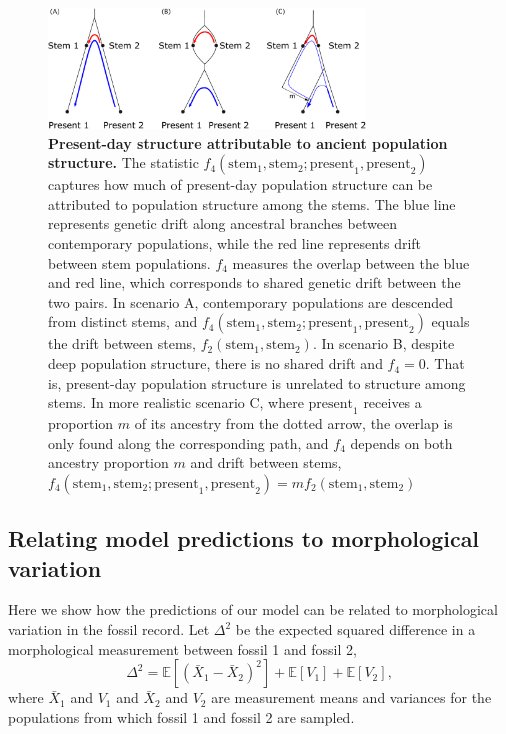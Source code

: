 \documentclass[]{article}
\newcommand{\E}{\mathbb{E}}
\begin{document}
\begin{figure}[ht]
    \centering
    \includegraphics[width=0.75\textwidth]{figures/supp-f4-scenarios}
    \caption{
        \textbf{Present-day structure attributable to ancient population structure.}
        The statistic 
        $f_4(\text{stem}_1, \text{stem}_2; \text{present}_1, \text{present}_2)$
        captures how much of present-day population structure can be attributed to 
        population structure among the stems. The blue line represents genetic drift 
        along ancestral branches between contemporary populations, while the red line 
        represents drift between stem populations. $f_4$ measures the overlap 
        between the blue and red line, which corresponds to shared genetic drift 
        between the two pairs. 
        In scenario A, contemporary populations are descended from distinct stems, and 
        $f_4(\text{stem}_1, \text{stem}_2; \text{present}_1, \text{present}_2)$
        equals the drift between stems, $f_2(\text{stem}_1, \text{stem}_2)$.
        In scenario B, despite deep population structure, there is no shared drift
        and $f_4=0$. That is, present-day population structure is unrelated to
        structure among stems. In more realistic scenario C, where $\text{present}_1$
        receives a proportion $m$ of its ancestry from the dotted arrow, the overlap
        is only found along the corresponding path, and $f_4$ depends on both
        ancestry proportion $m$ and drift between stems,
        $f_4(\text{stem}_1, \text{stem}_2; \text{present}_1, \text{present}_2)
        = mf_2(\text{stem}_1, \text{stem}_2)$
    }
    \label{fig:supp-f4-scenarios}
\end{figure}

\subsection{Relating model predictions to morphological variation}
\label{sec:morpho_diff}

Here we show how the predictions of our model can be related to morphological
variation in the fossil record.
Let $\Delta^2$ be the expected squared difference in a morphological measurement
between fossil 1 and fossil 2,
\begin{equation}
    \Delta^2=\E\left[\left(\bar{X}_1-\bar{X}_2\right)^2\right]+\E\left[V_1\right]+\E\left[V_2\right],
\end{equation}
where $\bar{X}_1$ and $V_1$ and $\bar{X}_2$ and $V_2$ are measurement means and
variances for the populations from which fossil 1 and fossil 2 are sampled.
\end{document}
